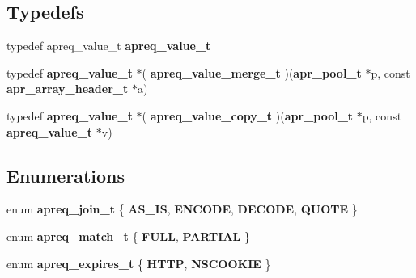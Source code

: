 \subsection*{Typedefs}
\begin{CompactItemize}
\item 
typedef apreq\_\-value\_\-t {\bf apreq\_\-value\_\-t}
\item 
typedef {\bf apreq\_\-value\_\-t} $\ast$( {\bf apreq\_\-value\_\-merge\_\-t} )({\bf apr\_\-pool\_\-t} $\ast$p, const {\bf apr\_\-array\_\-header\_\-t} $\ast$a)\label{group__Utils_a1}

\item 
typedef {\bf apreq\_\-value\_\-t} $\ast$( {\bf apreq\_\-value\_\-copy\_\-t} )({\bf apr\_\-pool\_\-t} $\ast$p, const {\bf apreq\_\-value\_\-t} $\ast$v)\label{group__Utils_a2}

\end{CompactItemize}
\subsection*{Enumerations}
\begin{CompactItemize}
\item 
enum {\bf apreq\_\-join\_\-t} \{ {\bf AS\_\-IS}, 
{\bf ENCODE}, 
{\bf DECODE}, 
{\bf QUOTE}
 \}
\item 
enum {\bf apreq\_\-match\_\-t} \{ {\bf FULL}, 
{\bf PARTIAL}
 \}
\item 
enum {\bf apreq\_\-expires\_\-t} \{ {\bf HTTP}, 
{\bf NSCOOKIE}
 \}
\end{CompactItemize}
